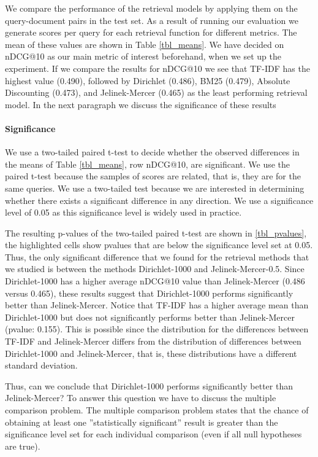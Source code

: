 We compare the performance of the retrieval models by applying them on the query-document pairs in the test set. 
As a result of running our evaluation we generate scores per query for each retrieval function
for different metrics. The mean of these values are shown in Table \ref{tbl_means}. 
We have decided on nDCG@10 as our main metric of interest beforehand, when we set up the experiment. If we compare the results for nDCG@10 we see that TF-IDF has the highest
value (0.490), followed by Dirichlet (0.486), BM25 (0.479), Absolute Discounting (0.473),
and Jelinek-Mercer (0.465) as the least performing retrieval model.
In the next paragraph we discuss the significance 
of these results



\paragraph{Significance}

We use a two-tailed paired t-test to decide whether the observed differences in the means 
of Table \ref{tbl_means}, row nDCG@10, are significant.
We use the paired t-test because the samples of scores are related,
that is, they are for the same queries.
We use a two-tailed test because we are interested in determining
whether there exists a significant difference in any direction.
We use a significance level of 0.05 as this significance level is widely used
in practice.

The resulting p-values of the two-tailed paired t-test are shown in \ref{tbl_pvalues},
the highlighted cells show pvalues that are below the significance level set at 0.05.
Thus, the only significant difference that we found for the retrieval methods
that we studied is between the methods Dirichlet-1000 and Jelinek-Mercer-0.5.
Since Dirichlet-1000 has a higher average nDCG@10 value than Jelinek-Mercer 
(0.486 versus 0.465), these results suggest that Dirichlet-1000 performs significantly
better than Jelinek-Mercer.
Notice that TF-IDF has a higher average mean than Dirichlet-1000 but 
does not significantly performs better than Jelinek-Mercer (pvalue: 0.155).
This is possible since the distribution for the differences between TF-IDF 
and Jelinek-Mercer differs from the distribution of differences between
Dirichlet-1000 and Jelinek-Mercer, that is, these distributions have a different 
standard deviation.

Thus, can we conclude that Dirichlet-1000 performs significantly better than Jelinek-Mercer?
To answer this question we have to discuss the multiple comparison problem.
The multiple comparison problem states that the chance of obtaining at least one ''statistically significant'' result is greater than the significance level set for each individual
comparison (even if all null hypotheses are true).

